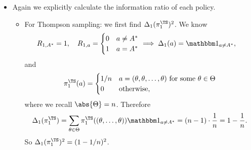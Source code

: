 \documentclass[11pt, openany]{book}
\begin{document}
\begin{example}
\begin{itemize}
        \item Again we explicitly calculate the information ratio of each policy.
            \begin{itemize}
                \item For Thompson sampling: we first find $\Delta_1(\pi_1^{\TS})^2$. We know
                    \begin{align*}
                        R_{1,A^*} & = 1, \quad R_{1,a} = \begin{cases}
                            0 & a\neq A^* \\
                        1 & a = A^*
                        \end{cases}
                            \implies \Delta_1(a) = \ind_{a\neq A^*},
                        \end{align*}
                        and
                        \[
                            \pi_1^{\TS}(a) = \begin{cases}
                                1/n & a = (\theta,\theta,\dots,\theta)\text{ for some }\theta\in\Theta \\
                                0 & \text{otherwise},
                            \end{cases}
                        \]
                        where we recall $\abs{\Theta}=n$. Therefore
                        \[
                            \Delta_1(\pi_1^{\TS}) = \sum_{\theta\in\Theta} \pi_1^{\TS}((\theta,\dots,\theta)) \ind_{a\neq A^*} = (n-1)\cdot \frac{1}{n} = 1-\frac{1}{n}.
                        \]
                        So $\Delta_1(\pi_1^{\TS})^2 = (1-1/n)^2$.


\end{itemize}
\end{itemize}
\end{example}
\end{document}
